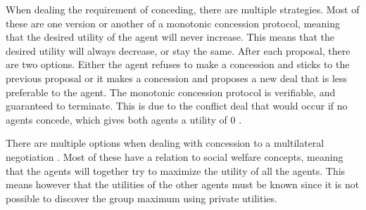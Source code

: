 %	
When dealing the requirement of conceding, there are multiple strategies. Most of these are one version or another of a monotonic concession protocol, meaning that the desired utility of the agent will never increase. This means that the desired utility will always decrease, or stay the same. After each proposal, there are two options. Either the agent refuses to make a concession and sticks to the previous proposal or it makes a concession and proposes a new deal that is less preferable to the agent. The monotonic concession protocol is verifiable, and guaranteed to terminate. This is due to the conflict deal that would occur if no agents concede, which gives both agents a utility of 0 \citep{endriss2006monotonic}.


There are multiple options when dealing with concession to a multilateral negotiation \citep{endriss2006monotonic}. Most of these have a relation to social welfare concepts, meaning that the agents will together try to maximize the utility of all the agents. This means however that the utilities of the other agents must be known since it is not possible to discover the group maximum using private utilities.

